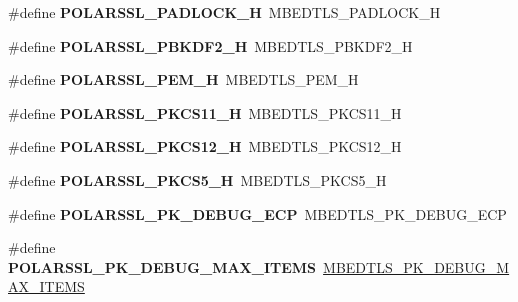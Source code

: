 \begin{DoxyCompactItemize}
\item 
\mbox{\label{compat-1_83_8h_ae84cd21d98c1ad2613d4cee27fe8b24f}} 
\#define {\bfseries P\+O\+L\+A\+R\+S\+S\+L\+\_\+\+P\+A\+D\+L\+O\+C\+K\+\_\+H}~M\+B\+E\+D\+T\+L\+S\+\_\+\+P\+A\+D\+L\+O\+C\+K\+\_\+H
\item 
\mbox{\label{compat-1_83_8h_a3e8653295edfb52ea8aeef4af2702c1f}} 
\#define {\bfseries P\+O\+L\+A\+R\+S\+S\+L\+\_\+\+P\+B\+K\+D\+F2\+\_\+H}~M\+B\+E\+D\+T\+L\+S\+\_\+\+P\+B\+K\+D\+F2\+\_\+H
\item 
\mbox{\label{compat-1_83_8h_a33979fc7b448b271ac0d4975e39000eb}} 
\#define {\bfseries P\+O\+L\+A\+R\+S\+S\+L\+\_\+\+P\+E\+M\+\_\+H}~M\+B\+E\+D\+T\+L\+S\+\_\+\+P\+E\+M\+\_\+H
\item 
\mbox{\label{compat-1_83_8h_a72ca340d801e3320435c0120961ef921}} 
\#define {\bfseries P\+O\+L\+A\+R\+S\+S\+L\+\_\+\+P\+K\+C\+S11\+\_\+H}~M\+B\+E\+D\+T\+L\+S\+\_\+\+P\+K\+C\+S11\+\_\+H
\item 
\mbox{\label{compat-1_83_8h_a9c0bbc259844d11c6d86e0d113b3554e}} 
\#define {\bfseries P\+O\+L\+A\+R\+S\+S\+L\+\_\+\+P\+K\+C\+S12\+\_\+H}~M\+B\+E\+D\+T\+L\+S\+\_\+\+P\+K\+C\+S12\+\_\+H
\item 
\mbox{\label{compat-1_83_8h_a0d9c64ca33f9f03e61d981e63327a7a5}} 
\#define {\bfseries P\+O\+L\+A\+R\+S\+S\+L\+\_\+\+P\+K\+C\+S5\+\_\+H}~M\+B\+E\+D\+T\+L\+S\+\_\+\+P\+K\+C\+S5\+\_\+H
\item 
\mbox{\label{compat-1_83_8h_a5098a0902ddb17d81f7bde19979e901b}} 
\#define {\bfseries P\+O\+L\+A\+R\+S\+S\+L\+\_\+\+P\+K\+\_\+\+D\+E\+B\+U\+G\+\_\+\+E\+CP}~M\+B\+E\+D\+T\+L\+S\+\_\+\+P\+K\+\_\+\+D\+E\+B\+U\+G\+\_\+\+E\+CP
\item 
\mbox{\label{compat-1_83_8h_a2565c73cdb12cc77e552cd3ed5a80960}} 
\#define {\bfseries P\+O\+L\+A\+R\+S\+S\+L\+\_\+\+P\+K\+\_\+\+D\+E\+B\+U\+G\+\_\+\+M\+A\+X\+\_\+\+I\+T\+E\+MS}~\mbox{\hyperlink{pk_8h_a73c1247ff4513b853b61b0dc36b69892}{M\+B\+E\+D\+T\+L\+S\+\_\+\+P\+K\+\_\+\+D\+E\+B\+U\+G\+\_\+\+M\+A\+X\+\_\+\+I\+T\+E\+MS}}
\item 
\mbox{\label{compat-1_83_8h_a3482006d64fdf9c4320a3dd3fc18765b}} 

\end{DoxyCompactItemize}
